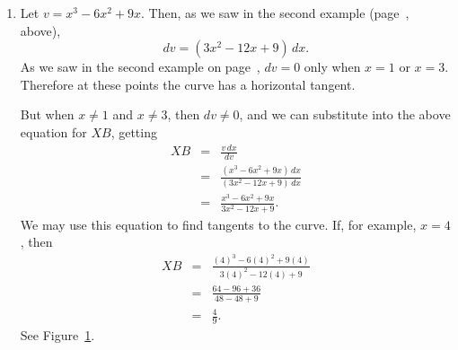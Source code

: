 \documentclass[polutonikogreek,english,twoside,openright]{article}
\newlength{\oldjot}
\begin{document}
\begin{enumerate}
\item Let $v = x^3 - 6x^2 + 9x.$ Then, as we saw in the second example (page~\pageref{ex2}, above),
$$dv = (3x^2 - 12x + 9)\,dx.$$
As we saw in the second example on page~\pageref{minex3}, $dv=0$ only when $x=1$ or $x=3$.  Therefore at these points the curve has a horizontal tangent.


But when $x \neq 1$ and $x \neq 3$, then $dv \neq 0$, and we can substitute into the above equation for $XB$, getting
\begin{eqnarray*}
XB & = & \frac{v\, dx}{dv}\\
& = & \frac{(x^3 - 6x^2 +9x)\,dx}{(3x^2 -12x +9)\,dx}\\
& = & \frac{x^3 - 6x^2 + 9x}{3x^2 - 12x + 9}.
\end{eqnarray*}
We may use this equation to find tangents to the curve.  If, for example, $x=4$, then
\begin{eqnarray*}
XB & = & \frac{(4)^3 - 6(4)^2 + 9(4)}{3(4)^2 - 12(4) + 9} \\
& = & \frac{64 - 96 + 36}{48 - 48 + 9}\\ 
& = & \frac{4}{9}.
\end{eqnarray*}
See Figure~\ref{tangex2}.
\begin{figure}[htp]
\begin{center}
\caption{}
\label{tangex2}
\vspace{-10pt}
\end{center}
\end{figure}

\end{enumerate}
\setlength{\jot}{\oldjot}
\end{document}
